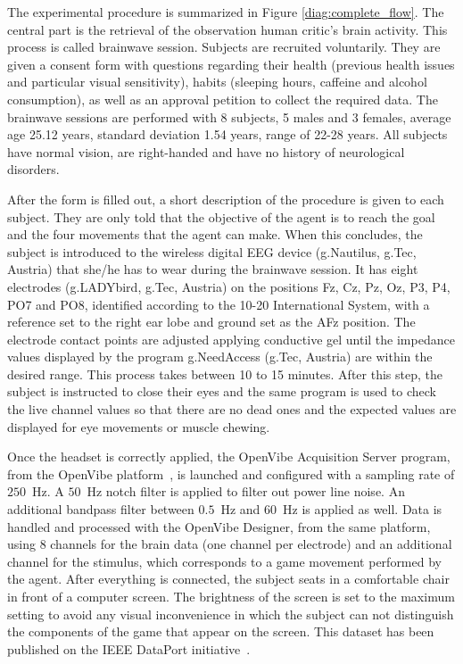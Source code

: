 \documentclass[journal]{IEEEtran}
\begin{document}
The experimental procedure is summarized in Figure \ref{diag:complete_flow}. The central part is the retrieval of the observation human critic's brain activity.  This process is called brainwave session. Subjects are recruited voluntarily. They are given a consent form with questions regarding their health (previous health issues and particular visual sensitivity), habits (sleeping hours, caffeine and alcohol consumption), as well as an approval petition to collect the required data. The brainwave sessions are performed with 8 subjects, 5 males and 3 females, average age 25.12 years, standard deviation 1.54 years, range of 22-28 years. All subjects have normal vision, are right-handed and have no history of neurological disorders.

After the form is filled out, a short description of the procedure is given to each subject. They are only told that the objective of the agent is to reach the goal and the four movements that the agent can make. When this concludes, the subject is introduced to the wireless digital EEG device (g.Nautilus, g.Tec, Austria) that she/he has to wear during the brainwave session. It has eight electrodes (g.LADYbird, g.Tec, Austria) on the positions Fz, Cz, Pz, Oz, P3, P4, PO7 and PO8, identified according to the 10-20 International System, with a reference set to the right ear lobe and ground set as the AFz position. The electrode contact points are adjusted applying conductive gel until the impedance values displayed by the program g.NeedAccess (g.Tec, Austria) are within the desired range. This process takes between 10 to 15 minutes. After this step, the subject is instructed to close their eyes and the same program is used to check the live channel values so that there are no dead ones and the expected values are displayed for eye movements or muscle chewing.

Once the headset is correctly applied, the OpenVibe Acquisition Server program, from the OpenVibe platform~\cite{OPEN-VIBE-PAPER}, is launched and configured with a sampling rate of $250$~Hz. A $50$~Hz notch filter is applied to filter out power line noise. An additional bandpass filter between $0.5$~Hz and $60$~Hz is applied as well. Data is handled and processed with the OpenVibe Designer, from the same platform, using 8 channels for the brain data (one channel per electrode) and an additional channel for the stimulus, which corresponds to a game movement performed by the agent.  After everything is connected, the subject seats in a comfortable chair in front of a computer screen. The brightness of the screen is set to the maximum setting to avoid any visual inconvenience in which the subject can not distinguish the components of the game that appear on the screen.  This dataset has been published on the IEEE DataPort initiative~\cite{6emh-wb46-19}.
\end{document}
